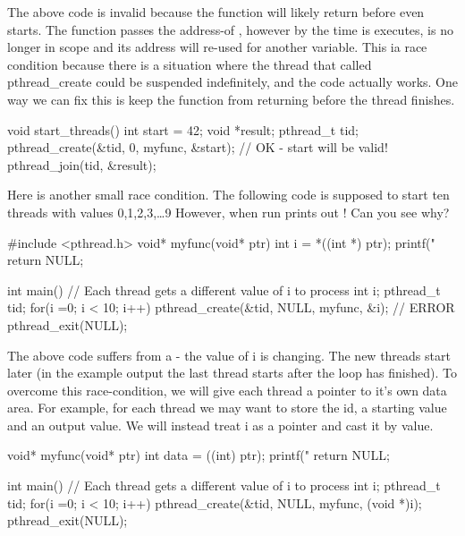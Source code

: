 The above code is invalid because the function  will likely return before  even starts. The function passes the address-of , however by the time  is executes,  is no longer in scope and its address will re-used for another variable. This ia race condition because there is a situation where the thread that called pthread\_create could be suspended indefinitely, and the code actually works. One way we can fix this is keep the function from returning before the thread finishes.

\begin{code}
void start_threads() {
  int start = 42;
  void *result;
  pthread_t tid;
  pthread_create(&tid, 0, myfunc, &start); // OK - start will be valid!
  pthread_join(tid, &result);
}
\end{code}

Here is another small race condition. The following code is supposed to start ten threads with values 0,1,2,3,\ldots{}9 However, when run prints out ! Can you see why?

\begin{code}[language=C]
#include <pthread.h>
void* myfunc(void* ptr) {
    int i = *((int *) ptr);
    printf("%
    return NULL;
}

int main() {
    // Each thread gets a different value of i to process
    int i;
    pthread_t tid;
    for(i =0; i < 10; i++) {
        pthread_create(&tid, NULL, myfunc, &i); // ERROR
    }
    pthread_exit(NULL);
}
\end{code}

The above code suffers from a  - the value of i is changing. The new threads start later (in the example output the last thread starts after the loop has finished). To overcome this race-condition, we will give each thread a pointer to it's own data area. For example, for each thread we may want to store the id, a starting value and an output value. We will instead treat i as a pointer and cast it by value.

\begin{code}[language=C]
void* myfunc(void* ptr) {
    int data = ((int) ptr);
    printf("%
    return NULL;
}

int main() {
    // Each thread gets a different value of i to process
    int i;
    pthread_t tid;
    for(i =0; i < 10; i++) {
        pthread_create(&tid, NULL, myfunc, (void *)i);
    }
    pthread_exit(NULL);
}
\end{code}

